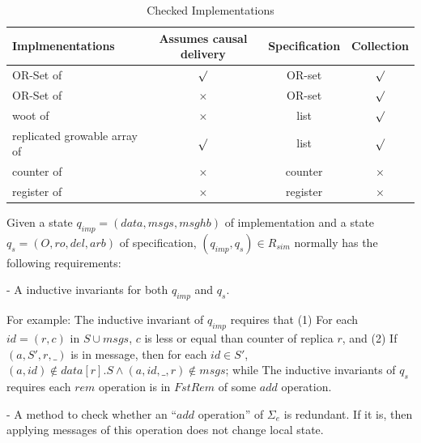 \begin{table}[h]
	\centering
	\begin{tabular}{|l|c|c|c|}\hline
        Implmenentations&Assumes causal delivery&Specification&Collection\\\hline
		OR-Set of \cite{Shapiro:2011} &  $\surd$ & OR-set & $\surd$\\
		OR-Set of \cite{Bieniusa:2012} & $\times$ & OR-set & $\surd$\\
        woot of \cite{Oster:2006} & $\times$ & list & $\surd$\\
        replicated growable array of \cite{Attiya:2016} & $\surd$ & list & $\surd$\\
        counter of \cite{Shapiro:2011} &  $\times$ & counter & $\times$\\
        register of \cite{Shapiro:2011} &  $\times$ & register & $\times$\\\hline
	\end{tabular}
	\caption{Checked Implementations}
	\label{tab:checked implementations}
\end{table}

Given a state $q_{\mathit{imp}} = (\mathit{data},\mathit{msgs},\mathit{msghb})$ of implementation and a state $q_s = (O,\mathit{ro},\mathit{del},\mathit{arb})$ of specification, $(q_{\mathit{imp}},q_s) \in R_{\mathit{sim}}$ normally has the following requirements:

\noindent - A inductive invariants for both $q_{\mathit{imp}}$ and $q_s$. %

For example: The inductive invariant of $q_{\mathit{imp}}$ requires that (1) For each $\mathit{id} = (r,c)$ in $S \cup \mathit{msgs}$, $c$ is less or equal than counter of replica $r$, and (2) If $(a,S',r,\_)$ is in message, then for each $\mathit{id} \in S'$, $(a,\mathit{id}) \notin \mathit{data}[r].S \wedge (a,\mathit{id},\_,r) \notin \mathit{msgs}$; while The inductive invariants of $q_s$ requires each $\mathit{rem}$ operation is in $\mathit{FstRem}$ of some $\mathit{add}$ operation.

\noindent - A method to check whether an ``$\mathit{add}$ operation'' of $\Sigma_e$ is redundant. If it is, then applying messages of this operation does not change local state.

